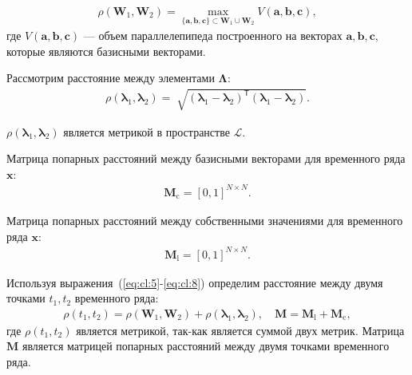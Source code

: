 \documentclass[12pt, twoside]{article}
\numberwithin{equation}{section}
\begin{document}
\begin{equation}
\label{eq:cl:5}
\begin{aligned}
\rho\left(\textbf{W}_1, \textbf{W}_2\right) = \max_{\{\textbf{a},\textbf{b},\textbf{c}\} \subset \textbf{W}_1\cup \textbf{W}_2 } V\left(\textbf{a},\textbf{b},\textbf{c}\right), 
\end{aligned}
\end{equation}
где $V\left(\textbf{a},\textbf{b},\textbf{c}\right)$ --- объем параллелепипеда построенного на векторах $\textbf{a}, \textbf{b}, \textbf{c}$, которые являются базисными векторами.


Рассмотрим расстояние между элементами $\bm{\Lambda}$:
\begin{equation}
\label{eq:cl:6}
\begin{aligned}
\rho\left(\bm{\lambda}_1, \bm{\lambda}_2\right) = \sqrt[]{\left(\bm{\lambda}_1 - \bm{\lambda}_2\right)^{\mathsf{T}}\left(\bm{\lambda}_1 - \bm{\lambda}_2\right)}.
\end{aligned}
\end{equation}

$\rho\left(\bm{\lambda}_1, \bm{\lambda}_2\right)$ является метрикой в пространстве $\mathcal{L}$.

Матрица попарных расстояний между базисными векторами для временного ряда $\textbf{x}$:
\begin{equation}
\label{eq:cl:7}
\begin{aligned}
\textbf{M}_{\text{c}} = [0, 1]^{N\times N}.
\end{aligned}
\end{equation}

Матрица попарных расстояний между собственными значениями для временного ряда $\textbf{x}$:
\begin{equation}
\label{eq:cl:8}
\begin{aligned}
\textbf{M}_{\text{l}} = [0, 1]^{N\times N}.
\end{aligned}
\end{equation}

Используя выражения~(\ref{eq:cl:5}-\ref{eq:cl:8}) определим расстояние между двумя точками $t_1, t_2$ временного ряда:
\begin{equation}
\label{eq:cl:9}
\begin{aligned}
\rho\left(t_1, t_2\right) = \rho\left(\textbf{W}_1, \textbf{W}_2\right) + \rho\left(\bm{\lambda}_1, \bm{\lambda}_2\right), \quad \textbf{M} = \textbf{M}_{\text{l}} + \textbf{M}_{\text{c}},
\end{aligned}
\end{equation}
где $\rho\left(t_1, t_2\right)$ является метрикой, так-как является суммой двух метрик. Матрица $\textbf{M}$ является матрицей попарных расстояний между двумя точками временного ряда.
\end{document}
